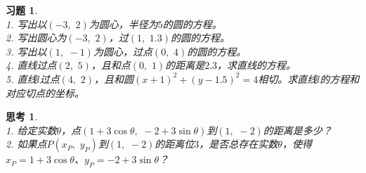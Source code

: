\documentclass[12pt,UTF8]{ctexbook}
\newtheorem{sk}{思考}[section]
\newtheorem{xt}{习题}[section]
\begin{document}
\begin{xt}
    \mbox{}\\
    1. 写出以$(-3, \,\,2)$为圆心，半径为$5$的圆的方程。\\
    2. 写出圆心为$(-3, \,\,2)$，过$(1,\,\, 1.3)$的圆的方程。\\
    3. 写出以$(1, \,\,-1)$为圆心，过点$(0,\,\, 4)$的圆的方程。\\
    4. 直线过点$(2,\,\,5)$，且和点$(0,\,\,1)$的距离是$2.3$，求直线的方程。\\
    5. 直线$l$过点$(4,\,\,2)$，且和圆$(x+1)^2 + (y - 1.5)^2 = 4$相切。求直线$l$的方程和对应切点的坐标。
\end{xt}

\begin{sk}
    \mbox{}\\
    1. 给定实数$\theta$，点$(1 + 3\cos\theta, \,\, -2 + 3\sin\theta)$到$(1, \,\,-2)$的距离是多少？\\
    2. 如果点$P(x_P, \,\,y_P)$到$(1, \,\,-2)$的距离位$3$，是否总存在实数$\theta$，使得$x_P = 1 + 3\cos\theta$、$y_P = -2 + 3\sin\theta$？
\end{sk}










\end{document}
